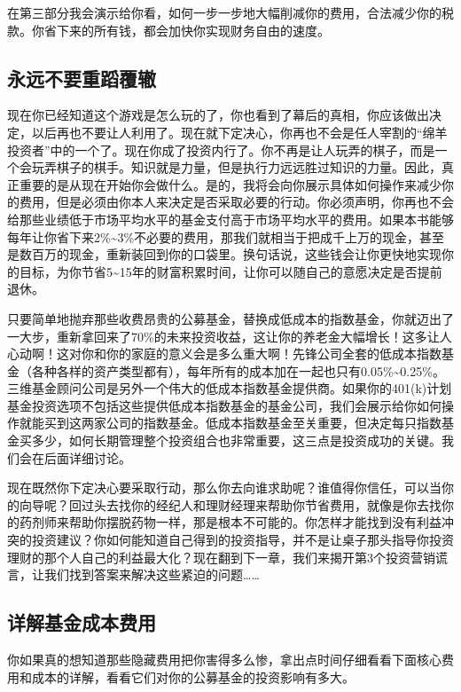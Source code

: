 在第三部分我会演示给你看，如何一步一步地大幅削减你的费用，合法减少你的税款。你省下来的所有钱，都会加快你实现财务自由的速度。

\subsection{永远不要重蹈覆辙}

现在你已经知道这个游戏是怎么玩的了，你也看到了幕后的真相，你应该做出决定，以后再也不要让人利用了。现在就下定决心，你再也不会是任人宰割的“绵羊投资者”中的一个了。现在你成了投资内行了。你不再是让人玩弄的棋子，而是一个会玩弄棋子的棋手。知识就是力量，但是执行力远远胜过知识的力量。因此，真正重要的是从现在开始你会做什么。是的，我将会向你展示具体如何操作来减少你的费用，但是必须由你本人来决定是否采取必要的行动。你必须声明，你再也不会给那些业绩低于市场平均水平的基金支付高于市场平均水平的费用。如果本书能够每年让你省下来2\%\textasciitilde{}3\%不必要的费用，那我们就相当于把成千上万的现金，甚至是数百万的现金，重新装回到你的口袋里。换句话说，这些钱会让你更快地实现你的目标，为你节省5\textasciitilde{}15年的财富积累时间，让你可以随自己的意愿决定是否提前退休。

只要简单地抛弃那些收费昂贵的公募基金，替换成低成本的指数基金，你就迈出了一大步，重新拿回来了70\%的未来投资收益，这让你的养老金大幅增长！这多让人心动啊！这对你和你的家庭的意义会是多么重大啊！先锋公司全套的低成本指数基金（各种各样的资产类型都有），每年所有的成本加在一起也只有0.05\%\textasciitilde{}0.25\%。三维基金顾问公司是另外一个伟大的低成本指数基金提供商。如果你的401(k)计划基金投资选项不包括这些提供低成本指数基金的基金公司，我们会展示给你如何操作就能买到这两家公司的指数基金。低成本指数基金至关重要，但决定每只指数基金买多少，如何长期管理整个投资组合也非常重要，这三点是投资成功的关键。我们会在后面详细讨论。

现在既然你下定决心要采取行动，那么你去向谁求助呢？谁值得你信任，可以当你的向导呢？回过头去找你的经纪人和理财经理来帮助你节省费用，就像是你去找你的药剂师来帮助你摆脱药物一样，那是根本不可能的。你怎样才能找到没有利益冲突的投资建议？你如何能知道自己得到的投资指导，并不是让桌子那头指导你投资理财的那个人自己的利益最大化？现在翻到下一章，我们来揭开第3个投资营销谎言，让我们找到答案来解决这些紧迫的问题……

\subsection{详解基金成本费用}

你如果真的想知道那些隐藏费用把你害得多么惨，拿出点时间仔细看看下面核心费用和成本的详解，看看它们对你的公募基金的投资影响有多大。

